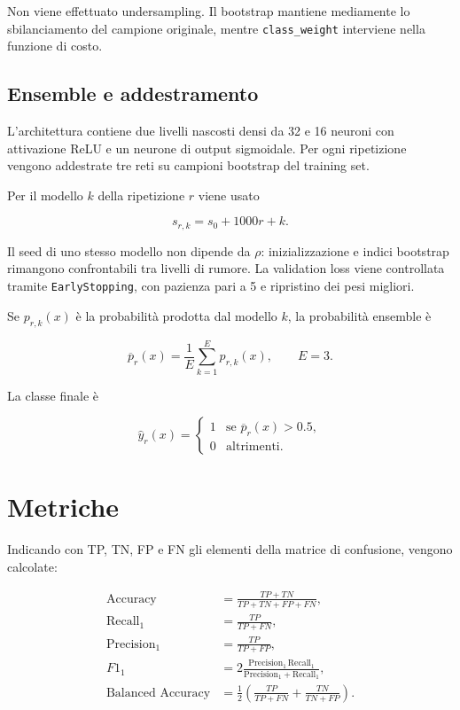 \documentclass[11pt,a4paper]{article}
\begin{document}
Non viene effettuato undersampling. Il bootstrap mantiene mediamente lo sbilanciamento del campione originale, mentre \texttt{class\_weight} interviene nella funzione di costo.

\subsection{Ensemble e addestramento}

L'architettura contiene due livelli nascosti densi da 32 e 16 neuroni con attivazione ReLU e un neurone di output sigmoidale. Per ogni ripetizione vengono addestrate tre reti su campioni bootstrap del training set.

Per il modello $k$ della ripetizione $r$ viene usato

\[
s_{r,k}=s_0+1000r+k.
\]

Il seed di uno stesso modello non dipende da $\rho$: inizializzazione e indici bootstrap rimangono confrontabili tra livelli di rumore. La validation loss viene controllata tramite \texttt{EarlyStopping}, con pazienza pari a 5 e ripristino dei pesi migliori.

Se $p_{r,k}(x)$ è la probabilità prodotta dal modello $k$, la probabilità ensemble è

\[
\overline{p}_r(x)=\frac{1}{E}\sum_{k=1}^{E}p_{r,k}(x),
\qquad E=3.
\]

La classe finale è

\[
\widehat{y}_r(x)=
\begin{cases}
1 & \text{se }\overline{p}_r(x)>0.5,\\
0 & \text{altrimenti.}
\end{cases}
\]

\section{Metriche}

Indicando con TP, TN, FP e FN gli elementi della matrice di confusione, vengono calcolate:

\begin{align*}
\text{Accuracy} &= \frac{TP+TN}{TP+TN+FP+FN},\\
\text{Recall}_1 &= \frac{TP}{TP+FN},\\
\text{Precision}_1 &= \frac{TP}{TP+FP},\\
F1_1 &= 2\frac{\text{Precision}_1\,\text{Recall}_1}
{\text{Precision}_1+\text{Recall}_1},\\
\text{Balanced Accuracy} &= \frac{1}{2}
\left(\frac{TP}{TP+FN}+\frac{TN}{TN+FP}\right).
\end{align*}
\end{document}
